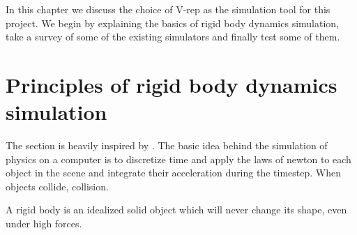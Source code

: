 In this chapter we discuss the choice of V-rep as the simulation tool for this project. We begin by explaining the basics of rigid body dynamics simulation, take a survey of some of the existing simulators and finally test some of them.

\section{Principles of rigid body dynamics simulation}
The section is heavily inspired by \cite{bender2014interactive}.
The basic idea behind the simulation of physics on a computer is to discretize time and apply the laws of newton to each object in the scene and integrate their acceleration during the timestep. When objects collide, collision.

A rigid body is an idealized solid object which will never change its shape, even under high forces.